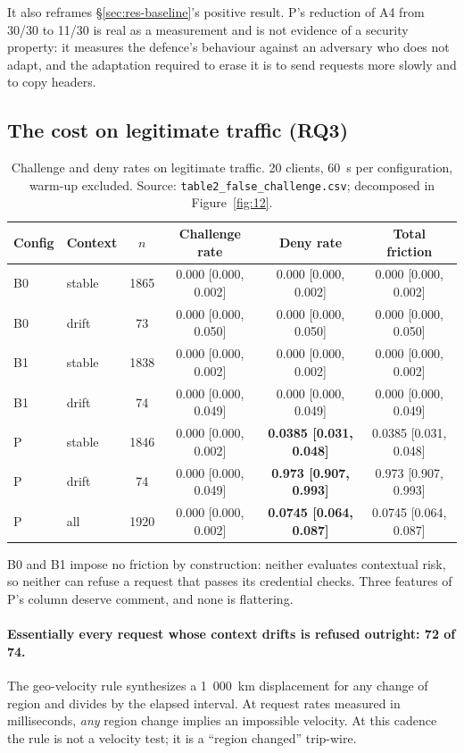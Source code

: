It also reframes \S\ref{sec:res-baseline}'s positive result. P's reduction of A4 from 30/30 to 11/30 is real as a measurement and is not evidence of a security property: it measures the defence's behaviour against an adversary who does not adapt, and the adaptation required to erase it is to send requests more slowly and to copy headers.

\subsection{The cost on legitimate traffic (RQ3)}
\label{sec:res-friction}

\setcounter{table}{3}
\begin{table}[t]
\centering
\caption{Challenge and deny rates on legitimate traffic. 20 clients, 60~s per configuration, warm-up excluded. Source: \texttt{table2\_false\_challenge.csv}; decomposed in Figure~\ref{fig:12}.}
\label{tab:4}
\small
\begin{tabular}{llcccc}
\toprule
Config & Context & $n$ & Challenge rate & Deny rate & Total friction \\
\midrule
B0 & stable & 1865 & 0.000 [0.000, 0.002] & 0.000 [0.000, 0.002] & 0.000 [0.000, 0.002] \\
B0 & drift & 73 & 0.000 [0.000, 0.050] & 0.000 [0.000, 0.050] & 0.000 [0.000, 0.050] \\
B1 & stable & 1838 & 0.000 [0.000, 0.002] & 0.000 [0.000, 0.002] & 0.000 [0.000, 0.002] \\
B1 & drift & 74 & 0.000 [0.000, 0.049] & 0.000 [0.000, 0.049] & 0.000 [0.000, 0.049] \\
P & stable & 1846 & 0.000 [0.000, 0.002] & \textbf{0.0385 [0.031, 0.048]} & 0.0385 [0.031, 0.048] \\
P & drift & 74 & 0.000 [0.000, 0.049] & \textbf{0.973 [0.907, 0.993]} & 0.973 [0.907, 0.993] \\
P & all & 1920 & 0.000 [0.000, 0.002] & \textbf{0.0745 [0.064, 0.087]} & 0.0745 [0.064, 0.087] \\
\bottomrule
\end{tabular}
\end{table}

B0 and B1 impose no friction by construction: neither evaluates contextual risk, so neither can refuse a request that passes its credential checks. Three features of P's column deserve comment, and none is flattering.

\paragraph{Essentially every request whose context drifts is refused outright: 72 of 74.} The geo-velocity rule synthesizes a 1~000~km displacement for any change of region and divides by the elapsed interval. At request rates measured in milliseconds, \textit{any} region change implies an impossible velocity. At this cadence the rule is not a velocity test; it is a ``region changed'' trip-wire.


